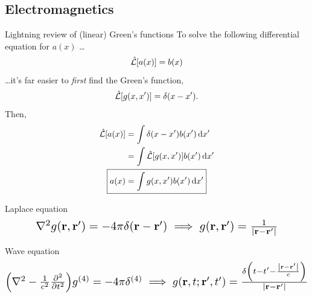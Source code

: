\documentclass[aspectratio=169]{beamer}
\begin{document}
\subsection{Electromagnetics}

\begin{frame}{Lightning review of (linear) Green's functions}
  To solve the following differential equation for $a(x)$ \ldots
  \begin{equation*}
    \hat{\mathcal{L}}\qty[a(x)] = b(x)
  \end{equation*}
  \ldots it's far easier to \emph{first} find the Green's function,
  \begin{equation*}
    \hat{\mathcal{L}}\qty[g(x, x')] = \delta(x - x').
  \end{equation*}
  Then,
  \begin{align*}
    \hat{\mathcal{L}}\qty[a(x)] &= \int \delta(x - x') b(x') \dd{x'} \\
                                &= \int \hat{\mathcal{L}}\qty[g(x, x')] b(x') \dd{x'} \\
                   \Aboxed{a(x) &= \int g(x, x') b(x') \dd{x'}}
  \end{align*}
\end{frame}

\begin{frame}
  \begin{block}{Laplace equation}
    \begin{equation*}
      \scalebox{1.4}{$\laplacian g(\vb{r}, \vb{r}') = -4 \pi \delta(\vb{r} - \vb{r}') \implies g(\vb{r}, \vb{r}') = \frac{1}{\abs{\vb{r} - \vb{r}'}}$}
    \end{equation*}
  \end{block}

  \begin{block}{Wave equation}
    \begin{equation*}
      \scalebox{1.4}{$\qty(\laplacian - \frac{1}{c^2}\pdv[2]{t}) g^{(4)} = -4 \pi \delta^{(4)} \implies g(\vb{r}, t; \vb{r}', t') = \frac{\delta\qty(t - t' - \frac{\abs{\vb{r} - \vb{r}'}}{c})}{\abs{\vb{r} - \vb{r}'}}$}
    \end{equation*}
  \end{block}
\end{frame}
\end{document}
